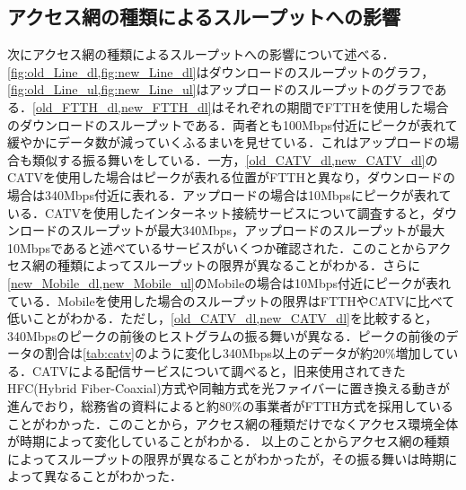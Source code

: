 \subsection{アクセス網の種類によるスループットへの影響}
次にアクセス網の種類によるスループットへの影響について述べる．\cref{fig:old_Line_dl,fig:new_Line_dl}はダウンロードのスループットのグラフ，\cref{fig:old_Line_ul,fig:new_Line_ul}はアップロードのスループットのグラフである．\cref{old_FTTH_dl,new_FTTH_dl}はそれぞれの期間でFTTHを使用した場合のダウンロードのスループットである．両者とも100Mbps付近にピークが表れて緩やかにデータ数が減っていくふるまいを見せている．これはアップロードの場合も類似する振る舞いをしている．一方，\cref{old_CATV_dl,new_CATV_dl}のCATVを使用した場合はピークが表れる位置がFTTHと異なり，ダウンロードの場合は340Mbps付近に表れる．アップロードの場合は10Mbpsにピークが表れている．CATVを使用したインターネット接続サービスについて調査すると，ダウンロードのスループットが最大340Mbps，アップロードのスループットが最大10Mbpsであると述べているサービスがいくつか確認された．このことからアクセス網の種類によってスループットの限界が異なることがわかる．さらに\cref{new_Mobile_dl,new_Mobile_ul}のMobileの場合は10Mbps付近にピークが表れている．Mobileを使用した場合のスループットの限界はFTTHやCATVに比べて低いことがわかる．ただし，\cref{old_CATV_dl,new_CATV_dl}を比較すると，340Mbpsのピークの前後のヒストグラムの振る舞いが異なる．ピークの前後のデータの割合は\cref{tab:catv}のように変化し340Mbps以上のデータが約20\%増加している．CATVによる配信サービスについて調べると，旧来使用されてきたHFC(Hybrid Fiber-Coaxial)方式や同軸方式を光ファイバーに置き換える動きが進んでおり，総務省の資料によると約80\%の事業者がFTTH方式を採用していることがわかった．このことから，アクセス網の種類だけでなくアクセス環境全体が時期によって変化していることがわかる．
以上のことからアクセス網の種類によってスループットの限界が異なることがわかったが，その振る舞いは時期によって異なることがわかった．

